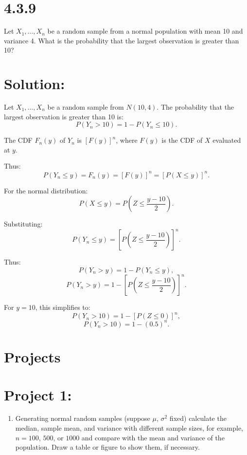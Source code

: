 \documentclass{article}
\begin{document}
\section*{4.3.9}

Let $X_1, \dots, X_n$ be a random sample from a normal population with mean 10 and variance 4. What is the probability that the largest observation is greater than 10?


\section*{Solution:}

Let $X_1, \dots, X_n$ be a random sample from $N(10, 4)$. The probability that the largest observation is greater than 10 is:
\[
P(Y_n > 10) = 1 - P(Y_n \leq 10).
\]

The CDF $F_n(y)$ of $Y_n$ is $[F(y)]^n$, where $F(y)$ is the CDF of $X$ evaluated at $y$.

Thus:
\[
P(Y_n \leq y) = F_n(y) = [F(y)]^n = [P(X \leq y)]^n.
\]

For the normal distribution:
\[
P(X \leq y) = P\left(Z \leq \frac{y - 10}{2}\right).
\]

Substituting:
\[
P(Y_n \leq y) = \left[P\left(Z \leq \frac{y - 10}{2}\right)\right]^n.
\]

Thus:
\[
P(Y_n > y) = 1 - P(Y_n \leq y),
\]
\[
P(Y_n > y) = 1 - \left[P\left(Z \leq \frac{y - 10}{2}\right)\right]^n.
\]

For \( y = 10 \), this simplifies to:
\[
P(Y_n > 10) = 1 - \left[P(Z \leq 0)\right]^n,
\]
\[
P(Y_n > 10) = 1 - (0.5)^n.
\]

\newpage %

\section*{\LARGE Projects}

\section*{Project 1:}

\begin{enumerate}
    \item Generating normal random samples (suppose $\mu$, $\sigma^2$ fixed) calculate the median, sample mean, and variance with different sample sizes, for example, $n = 100$, $500$, or $1000$ and compare with the mean and variance of the population. Draw a table or figure to show them, if necessary.
\end{enumerate}
\end{document}
